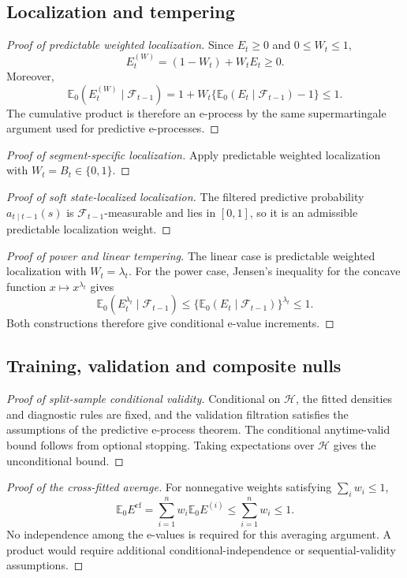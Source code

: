 \documentclass[pdflatex,sn-basic]{sn-jnl}
\newcommand{\E}{\mathbb E}
\newcommand{\1}{\mathbf 1}
\newcommand{\calF}{\mathcal F}
\newcommand{\calH}{\mathcal H}
\begin{document}
\subsection{Localization and tempering}

\begin{proof}[Proof of predictable weighted localization]
Since $E_t\geq0$ and $0\leq W_t\leq1$,
\[
E_t^{(W)}=(1-W_t)+W_tE_t\geq0.
\]
Moreover,
\[
\E_0(E_t^{(W)}\mid\calF_{t-1})
=1+W_t\{\E_0(E_t\mid\calF_{t-1})-1\}
\leq1.
\]
The cumulative product is therefore an e-process by the same supermartingale argument used for predictive e-processes.
\end{proof}

\begin{proof}[Proof of segment-specific localization]
Apply predictable weighted localization with $W_t=B_t\in\{0,1\}$.
\end{proof}

\begin{proof}[Proof of soft state-localized localization]
The filtered predictive probability $a_{t\mid t-1}(s)$ is $\calF_{t-1}$-measurable and lies in $[0,1]$, so it is an admissible predictable localization weight.
\end{proof}

\begin{proof}[Proof of power and linear tempering]
The linear case is predictable weighted localization with $W_t=\lambda_t$. For the power case, Jensen's inequality for the concave function $x\mapsto x^{\lambda_t}$ gives
\[
\E_0(E_t^{\lambda_t}\mid\calF_{t-1})
\leq \{\E_0(E_t\mid\calF_{t-1})\}^{\lambda_t}
\leq1.
\]
Both constructions therefore give conditional e-value increments.
\end{proof}

\subsection{Training, validation and composite nulls}

\begin{proof}[Proof of split-sample conditional validity]
Conditional on $\calH$, the fitted densities and diagnostic rules are fixed, and the validation filtration satisfies the assumptions of the predictive e-process theorem. The conditional anytime-valid bound follows from optional stopping. Taking expectations over $\calH$ gives the unconditional bound.
\end{proof}

\begin{proof}[Proof of the cross-fitted average]
For nonnegative weights satisfying $\sum_iw_i\leq1$,
\[
\E_0E^{\mathrm{cf}}
=\sum_{i=1}^nw_i\E_0E^{(i)}
\leq \sum_{i=1}^nw_i\leq1.
\]
No independence among the e-values is required for this averaging argument. A product would require additional conditional-independence or sequential-validity assumptions.
\end{proof}
\end{document}
